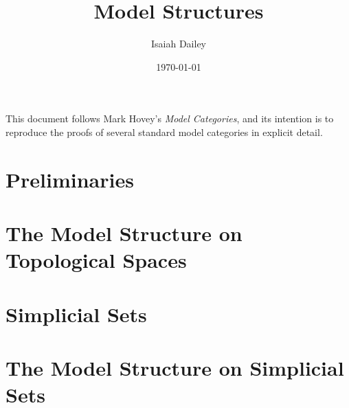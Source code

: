 \documentclass{amsart}
\title{Model Structures}
\author{Isaiah Dailey}
\date{\today}
\theoremstyle{plain}
\theoremstyle{definition}
\newcommand{\0}{\mathbf{0}}
\renewcommand{\(}{\left(}
\renewcommand{\)}{\right)}
\begin{document}
\maketitle


\tableofcontents

This document follows Mark Hovey's \textit{Model Categories}, and its intention is to reproduce the proofs of several standard model categories in explicit detail.

\section{Preliminaries}



\section{The Model Structure on Topological Spaces}



\section{Simplicial Sets}



\section{The Model Structure on Simplicial Sets}


\end{document}

